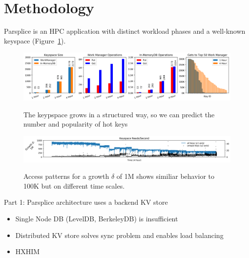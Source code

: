 \section{Methodology}

Parsplice is an HPC application with distinct workload phases and a well-known keyspace (Figure~\ref{fig:keyspace-size}).
\begin{figure}[tbh]
  \noindent\includegraphics[width=1\textwidth]{figures/keyspace-size.png}\\
  \caption{The keypspace grows in a structured way, so we can predict the
  number and popularity of hot keys 
  \label{fig:keyspace-size}}
\end{figure}

\begin{figure}[tbh]
  \noindent\includegraphics[width=1\textwidth]{figures/keyspace-regimes-4hr.png}\\
  \caption{Access patterns for a growth \(\delta\) of 1M shows similiar
  behavior to 100K but on different time scales.
  \label{fig:keyspace-regimes-4hr}}
\end{figure}

Part 1: Parsplice architecture uses a backend KV store
\begin{itemize}
  \item Single Node DB (LevelDB, BerkeleyDB) is insufficient
  \item Distributed KV store solves sync problem and enables load balancing
  \item HXHIM 
\end{itemize}

